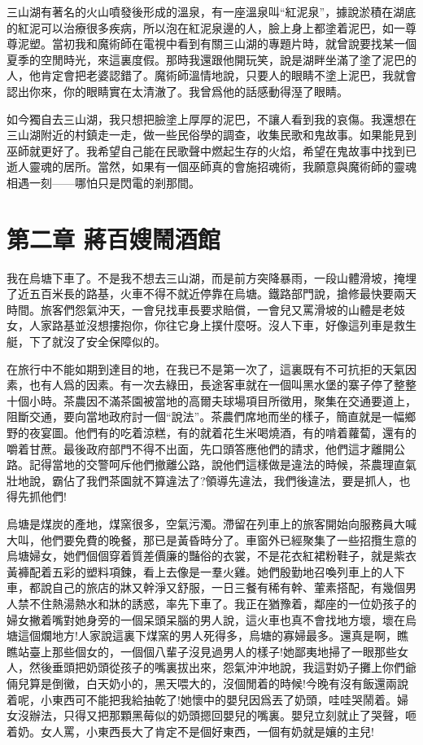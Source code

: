 \documentclass[a6paper]{article}
\begin{document}
三山湖有著名的火山噴發後形成的溫泉，有一座溫泉叫“紅泥泉”，據說淤積在湖底的紅泥可以治療很多疾病，所以泡在紅泥泉邊的人，臉上身上都塗着泥巴，如一尊尊泥塑。當初我和魔術師在電視中看到有關三山湖的專題片時，就曾說要找某一個夏季的空閒時光，來這裏度假。那時我還跟他開玩笑，說是湖畔坐滿了塗了泥巴的人，他肯定會把老婆認錯了。魔術師溫情地說，只要人的眼睛不塗上泥巴，我就會認出你來，你的眼睛實在太清澈了。我曾爲他的話感動得溼了眼睛。

如今獨自去三山湖，我只想把臉塗上厚厚的泥巴，不讓人看到我的哀傷。我還想在三山湖附近的村鎮走一走，做一些民俗學的調查，收集民歌和鬼故事。如果能見到巫師就更好了。我希望自己能在民歌聲中燃起生存的火焰，希望在鬼故事中找到已逝人靈魂的居所。當然，如果有一個巫師真的會施招魂術，我願意與魔術師的靈魂相遇一刻——哪怕只是閃電的剎那間。

\pagebreak

\section{第二章 蔣百嫂鬧酒館}

我在烏塘下車了。不是我不想去三山湖，而是前方突降暴雨，一段山體滑坡，掩埋了近五百米長的路基，火車不得不就近停靠在烏塘。鐵路部門說，搶修最快要兩天時間。旅客們怨氣沖天，一會兒找車長要求賠償，一會兒又罵滑坡的山體是老妓女，人家路基並沒想摟抱你，你往它身上撲什麼呀。沒人下車，好像這列車是救生艇，下了就沒了安全保障似的。

在旅行中不能如期到達目的地，在我已不是第一次了，這裏既有不可抗拒的天氣因素，也有人爲的因素。有一次去綠田，長途客車就在一個叫黑水堡的寨子停了整整十個小時。茶農因不滿茶園被當地的高爾夫球場項目所徵用，聚集在交通要道上，阻斷交通，要向當地政府討一個“說法”。茶農們席地而坐的樣子，簡直就是一幅鄉野的夜宴圖。他們有的吃着涼糕，有的就着花生米喝燒酒，有的啃着蘿蔔，還有的嚼着甘蔗。最後政府部門不得不出面，先口頭答應他們的請求，他們這才離開公路。記得當地的交警呵斥他們撤離公路，說他們這樣做是違法的時候，茶農理直氣壯地說，霸佔了我們茶園就不算違法了?領導先違法，我們後違法，要是抓人，也得先抓他們!

烏塘是煤炭的產地，煤窯很多，空氣污濁。滯留在列車上的旅客開始向服務員大喊大叫，他們要免費的晚餐，那已是黃昏時分了。車窗外已經聚集了一些招攬生意的烏塘婦女，她們個個穿着質差價廉的豔俗的衣裳，不是花衣紅裙粉鞋子，就是紫衣黃褲配着五彩的塑料項鍊，看上去像是一羣火雞。她們殷勤地召喚列車上的人下車，都說自己的旅店的牀又幹淨又舒服，一日三餐有稀有幹、葷素搭配，有幾個男人禁不住熱湯熱水和牀的誘惑，率先下車了。我正在猶豫着，鄰座的一位奶孩子的婦女撇着嘴對她身旁的一個呆頭呆腦的男人說，這火車也真不會找地方壞，壞在烏塘這個爛地方!人家說這裏下煤窯的男人死得多，烏塘的寡婦最多。還真是啊，瞧瞧站臺上那些個女的，一個個八輩子沒見過男人的樣子!她鄙夷地掃了一眼那些女人，然後垂頭把奶頭從孩子的嘴裏拔出來，怨氣沖沖地說，我這對奶子攤上你們爺倆兒算是倒黴，白天奶小的，黑天喂大的，沒個閒着的時候!今晚有沒有飯還兩說着呢，小東西可不能把我給抽乾了!她懷中的嬰兒因爲丟了奶頭，哇哇哭鬧着。婦女沒辦法，只得又把那顆黑莓似的奶頭摁回嬰兒的嘴裏。嬰兒立刻就止了哭聲，咂着奶。女人罵，小東西長大了肯定不是個好東西，一個有奶就是孃的主兒!
\end{document}
